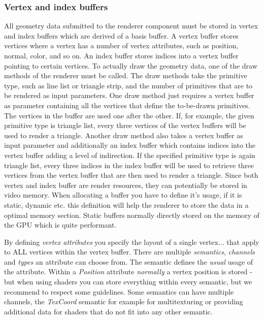 \subsubsection{Vertex and index buffers}
All geometry data submitted to the renderer component must be stored in vertex and index buffers which are derived of a basis buffer. A vertex buffer stores vertices where a vertex has a number of vertex attributes, such as position, normal, color, and so on. An index buffer stores indices into a vertex buffer pointing to certain vertices. To actually draw the geometry data, one of the draw methods of the renderer must be called. The draw methods take the primitive type, such as line list or triangle strip, and the number of primitives that are to be rendered as input parameters. One draw method just requires a vertex buffer as parameter containing all the vertices that define the to-be-drawn primitives. The vertices in the buffer are used one after the other. If, for example, the given primitive type is triangle list, every three vertices of the vertex buffers will be used to render a triangle. Another draw method also takes a vertex buffer as input parameter and additionally an index buffer which contains indices into the vertex buffer adding a level of indirection. If the specified primitive type is again triangle list, every three indices in the index buffer will be used to retrieve three vertices from the vertex buffer that are then used to render a triangle. Since both vertex and index buffer are render resources, they can potentially be stored in video memory. When allocating a buffer you have to define it's usage, if it is static, dynamic etc. this definition will help the renderer to store the data in a optimal memory section. Static buffers normally directly stored on the 
memory of the GPU which is quite performant.

By defining \emph{vertex attributes} you specify the layout of a single vertex... that apply to ALL vertices within the vertex buffer. There are multiple \emph{semantics}, \emph{channels} and \emph{types} an attribute can choose from. The semantic defines the \emph{usual} usage of the attribute. Within a \emph{Position} attribute \emph{normally} a vertex position is stored - but when using shaders you can store everything within every semantic, but we recommend to respect some guidelines. Some semantics can have multiple channels, the \emph{TexCoord} semantic for example for multitexturing or providing additional data for shaders that do not fit into any other semantic.


